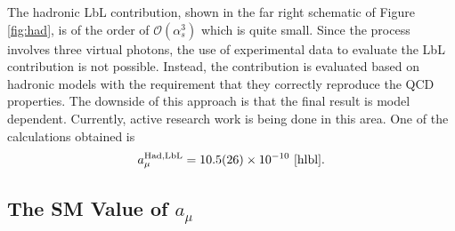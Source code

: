 \documentclass{outhesis}
\begin{document}
The hadronic LbL contribution, shown in the far right schematic of Figure \ref{fig:had}, is of the order of $\mathcal{O}\left(\alpha_s^3\right)$ which is quite small. Since the process involves three virtual photons, the use of experimental data to evaluate the LbL contribution is not possible. Instead, the contribution is evaluated based on hadronic models with the requirement that they correctly reproduce the QCD properties. The downside of this approach is that the final result is model dependent. Currently, active research work is being done in this area. One of the calculations obtained is 
\begin{equation}
a_{\mu}^{\text{Had,LbL}} = 10.5(26) \times 10^{-10} \,\,\cite{hlbl}. 
\label{eq:hlbl}
\end{equation}

\subsection{The SM Value of $a_{\mu}$ }
\end{document}
